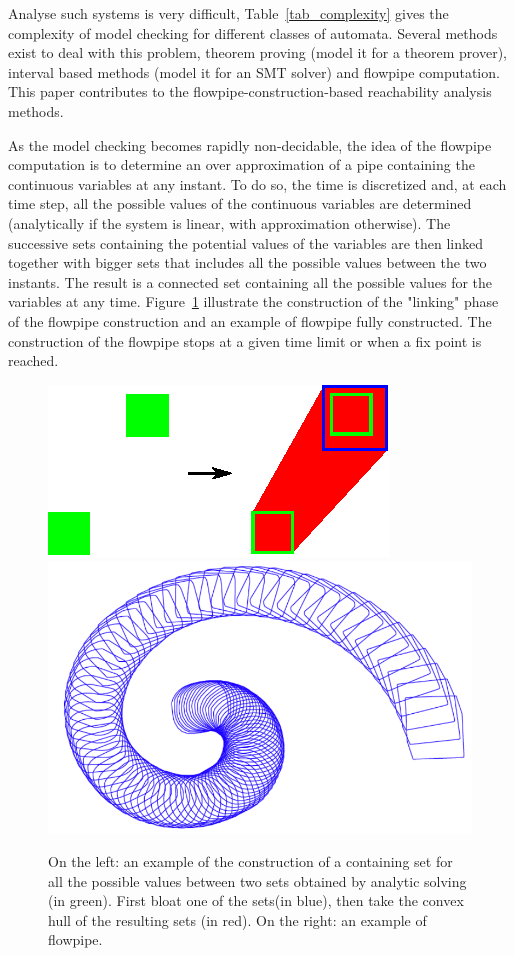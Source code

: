 Analyse such systems is very difficult, Table~\ref{tab_complexity} gives the complexity of model checking for different classes of automata. Several methods exist to deal with this problem, theorem proving (model it for a theorem prover), interval based methods (model it for an SMT solver) and flowpipe computation. This paper contributes to the flowpipe-construction-based reachability analysis methods. 

As the model checking becomes rapidly non-decidable, the idea of the flowpipe computation is to determine an over approximation of a pipe containing the continuous variables at any instant. To do so, the time is discretized and, at each time step, all the possible values of the continuous variables are determined (analytically if the system is linear, with approximation otherwise). The successive sets containing the potential values of the variables are then linked together with bigger sets that includes all the possible values between the two instants. The result is a connected set containing all the possible values for the variables at any time. Figure~\ref{fowpipeconstruction} illustrate the construction of the "linking" phase of the flowpipe construction and an example of flowpipe fully constructed. The construction of the flowpipe stops at a given time limit or when a fix point is reached.

\begin{figure}
\includegraphics[scale=1]{images/flowpipe.eps}
\includegraphics[scale=0.2]{images/zono.png}
\caption{On the left: an example of the construction of a containing set for all the possible values between two sets obtained by analytic solving (in green). First bloat one of the sets(in blue), then take the convex hull of the resulting sets (in red). On the right: an example of flowpipe.}
\label{fowpipeconstruction}
\end{figure}


